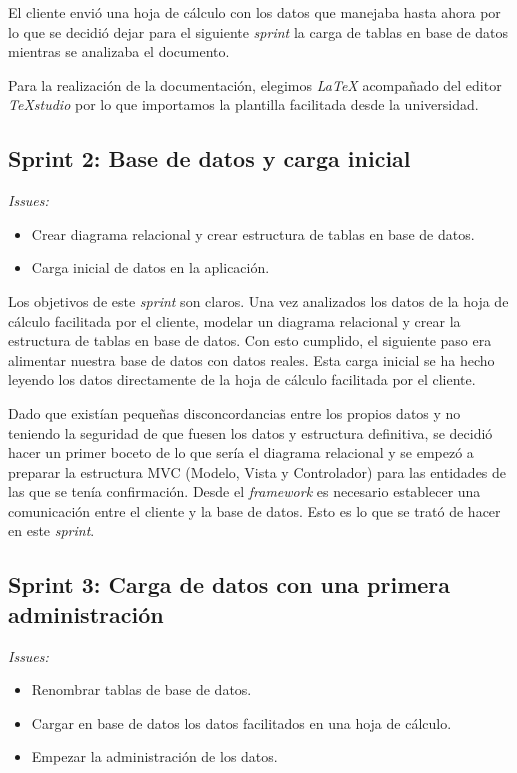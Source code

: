 El cliente envió una hoja de cálculo con los datos que manejaba hasta ahora por lo que se decidió dejar para el siguiente \textit{sprint} la carga de tablas en base de datos mientras se analizaba el documento.

Para la realización de la documentación, elegimos \textit{\LaTeX} acompañado del editor \textit{\TeX studio} por lo que importamos la plantilla facilitada desde la universidad.

\subsection{Sprint 2: Base de datos y carga inicial}

\textit{Issues:}
\begin{itemize}
	\item Crear diagrama relacional y crear estructura de tablas en base de datos.
	\item Carga inicial de datos en la aplicación.
\end{itemize}

Los objetivos de este \textit{sprint} son claros. Una vez analizados los datos de la hoja de cálculo facilitada por el cliente, modelar un diagrama relacional y crear la estructura de tablas en base de datos. Con esto cumplido, el siguiente paso era alimentar nuestra base de datos con datos reales. Esta carga inicial se ha hecho leyendo los datos directamente de la hoja de cálculo facilitada por el cliente.

Dado que existían pequeñas disconcordancias entre los propios datos y no teniendo la seguridad de que fuesen los datos y estructura definitiva, se decidió hacer un primer boceto de lo que sería el diagrama relacional y se empezó a preparar la estructura MVC (Modelo, Vista y Controlador) para las entidades de las que se tenía confirmación. Desde el \textit{framework} es necesario establecer una comunicación entre el cliente y la base de datos. Esto es lo que se trató de hacer en este \textit{sprint}.

\subsection{Sprint 3: Carga de datos con una primera administración}
\textit{Issues:}
\begin{itemize}
	\item Renombrar tablas de base de datos.
	\item Cargar en base de datos los datos facilitados en una hoja de cálculo.
	\item Empezar la administración de los datos.
\end{itemize}

